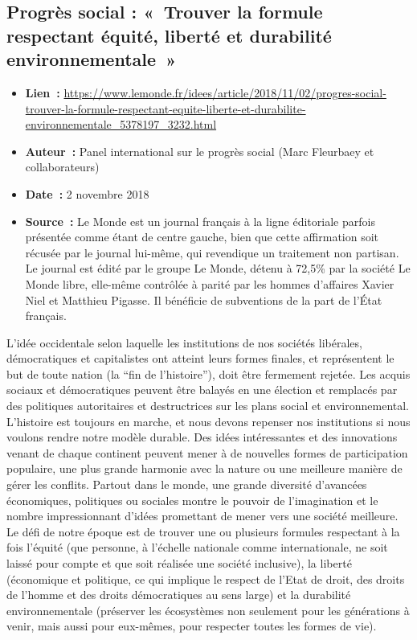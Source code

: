 \documentclass[8pt]{article}
\begin{document}
\subsection{Progrès social : «\ Trouver la formule respectant équité, liberté et durabilité environnementale\ »}
\begin{itemize}
	 \setlength\itemsep{-0.1em}
	\item \textbf{Lien~: }  \url{https://www.lemonde.fr/idees/article/2018/11/02/progres-social-trouver-la-formule-respectant-equite-liberte-et-durabilite-environnementale_5378197_3232.html} 
	\item \textbf{Auteur~: } Panel international sur le progrès social (Marc Fleurbaey et collaborateurs)
	\item \textbf{Date~: } 2 novembre 2018
	\item \textbf{Source~: }   Le Monde est un journal  français à la ligne éditoriale parfois présentée comme étant de centre gauche, bien que cette affirmation soit récusée par le journal lui-même, qui revendique un traitement non partisan. Le journal est édité par le groupe Le Monde, détenu à 72,5\% par la société Le Monde libre, elle-même contrôlée à parité par les hommes d'affaires Xavier Niel et Matthieu Pigasse. Il bénéficie de subventions de la part de l'État français.
\end{itemize}

L’idée occidentale selon laquelle les institutions de nos sociétés libérales, démocratiques et capitalistes ont atteint leurs formes finales, et représentent le but de toute nation (la “fin de l’histoire”), doit être fermement rejetée. Les acquis sociaux et démocratiques peuvent être balayés en une élection et remplacés par des politiques autoritaires et destructrices sur les plans social et environnemental. L’histoire est toujours en marche, et nous devons repenser nos institutions si nous voulons rendre notre modèle durable. Des idées intéressantes et des innovations venant de chaque continent peuvent mener à de nouvelles formes de participation populaire, une plus grande harmonie avec la nature ou une meilleure manière de gérer les conflits. Partout dans le monde, une grande diversité d’avancées économiques, politiques ou sociales montre le pouvoir de l’imagination et le nombre impressionnant d’idées promettant de mener vers une société meilleure.\\

Le défi de notre époque est de trouver une ou plusieurs formules respectant à la fois l’équité (que personne, à l’échelle nationale comme internationale, ne soit laissé pour compte et que soit réalisée une société inclusive), la liberté (économique et politique, ce qui implique le respect de l’Etat de droit, des droits de l’homme et des droits démocratiques au sens large) et la durabilité environnementale (préserver les écosystèmes non seulement pour les générations à venir, mais aussi pour eux-mêmes, pour respecter toutes les formes de vie).\\
\end{document}
